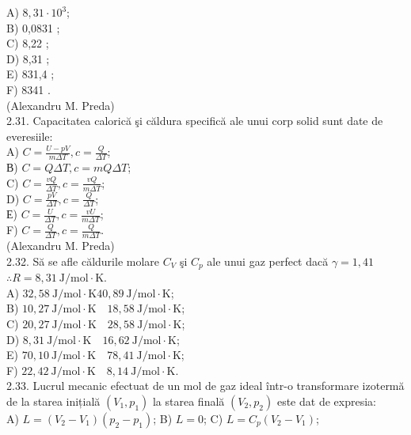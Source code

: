 \documentclass[10pt]{article}
\begin{document}
A) $8,31 \cdot 10^{3}$;\\
B) 0,0831 ;\\
C) 8,22 ;\\
D) 8,31 ;\\
E) 831,4 ;\\
F) 8341 .\\
(Alexandru M. Preda)\\
2.31. Capacitatea calorică şi căldura specifică ale unui corp solid sunt date de everesiile:\\
A) $C=\frac{U-p V}{m \Delta T}, c=\frac{Q}{\Delta T}$;\\
В) $C=Q \Delta T, c=m Q \Delta T$;\\
C) $C=\frac{v Q}{\Delta T}, c=\frac{v Q}{m \Delta T}$;\\
D) $C=\frac{p V}{\Delta T}, c=\frac{Q}{\Delta T}$;\\
Е) $C=\frac{U}{\Delta T}, c=\frac{v U}{m \Delta T}$;\\
F) $C=\frac{Q}{\Delta T}, c=\frac{Q}{m \Delta T}$.\\
(Alexandru M. Preda)\\
2.32. Să se afle căldurile molare $C_{V}$ şi $C_{p}$ ale unui gaz perfect dacă $\gamma=1,41$ $\therefore R=8,31 \mathrm{~J} / \mathrm{mol} \cdot \mathrm{K}$.\\
A) $32,58 \mathrm{~J} / \mathrm{mol} \cdot \mathrm{K} 40,89 \mathrm{~J} / \mathrm{mol} \cdot \mathrm{K}$;\\
B) $10,27 \mathrm{~J} / \mathrm{mol} \cdot \mathrm{K} \quad 18,58 \mathrm{~J} / \mathrm{mol} \cdot \mathrm{K}$;\\
C) $20,27 \mathrm{~J} / \mathrm{mol} \cdot \mathrm{K} \quad 28,58 \mathrm{~J} / \mathrm{mol} \cdot \mathrm{K}$;\\
D) $8,31 \mathrm{~J} / \mathrm{mol} \cdot \mathrm{K} \quad 16,62 \mathrm{~J} / \mathrm{mol} \cdot \mathrm{K}$;\\
E) $70,10 \mathrm{~J} / \mathrm{mol} \cdot \mathrm{K} \quad 78,41 \mathrm{~J} / \mathrm{mol} \cdot \mathrm{K}$;\\
F) $22,42 \mathrm{~J} / \mathrm{mol} \cdot \mathrm{K} \quad 8,14 \mathrm{~J} / \mathrm{mol} \cdot \mathrm{K}$.\\
2.33. Lucrul mecanic efectuat de un mol de gaz ideal într-o transformare izotermă de la starea inițială $\left(V_{1}, p_{1}\right)$ la starea finală $\left(V_{2}, p_{2}\right)$ este dat de expresia:\\
A) $L=\left(V_{2}-V_{1}\right)\left(p_{2}-p_{1}\right)$; B) $L=0$; C) $L=C_{p}\left(V_{2}-V_{1}\right)$;\\
\end{document}

